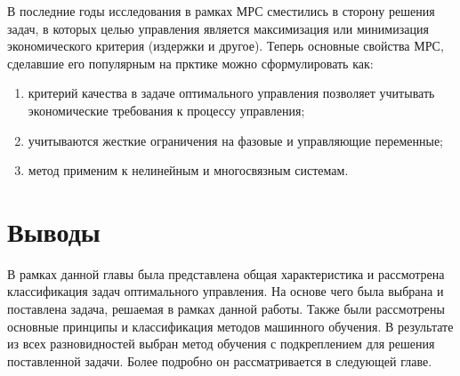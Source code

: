 В последние годы исследования в рамках МРС сместились в сторону решения задач, в которых целью управления является максимизация или минимизация экономического критерия (издержки и другое). Теперь   основные свойства МРС, сделавшие его популярным на прктике можно сформулировать как:
\begin{enumerate}
	\item критерий качества в задаче оптимального управления  позволяет учитывать экономические требования к процессу управления;
	\item учитываются жесткие ограничения на фазовые и управляющие переменные;
	\item метод применим к нелинейным и многосвязным системам.
\end{enumerate}



\section{Выводы}\label{1sec:conc}

В рамках данной главы была представлена общая характеристика и рассмотрена классификация задач оптимального управления. На основе чего была выбрана и поставлена задача, решаемая в рамках данной работы. Также были рассмотрены основные принципы и классификация методов машинного обучения. В результате из всех разновидностей выбран метод обучения с подкреплением для решения поставленной задачи. Более подробно он рассматривается в следующей главе.